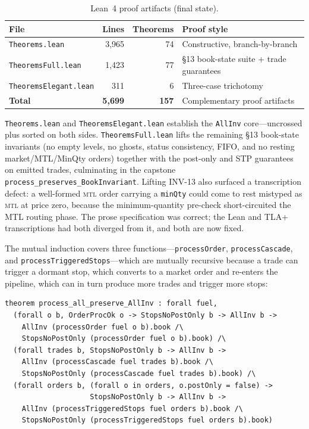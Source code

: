 \documentclass[11pt,a4paper]{article}
\begin{document}
\begin{table}[H]
\centering
\caption{Lean~4 proof artifacts (final state).}
\label{tab:lean-stats}
\small
\begin{tabular}{@{}lrrl@{}}
\toprule
File & Lines & Theorems & Proof style \\
\midrule
\texttt{Theorems.lean}         & 3{,}965 & 74 & Constructive, branch-by-branch \\
\texttt{TheoremsFull.lean}     & 1{,}423 & 77 & \S13 book-state suite + trade guarantees \\
\texttt{TheoremsElegant.lean}  &    311  &  6 & Three-case trichotomy \\
\midrule
\textbf{Total}                 & \textbf{5{,}699} & \textbf{157} & Complementary proof artifacts \\
\bottomrule
\end{tabular}
\end{table}

\texttt{Theorems.lean} and \texttt{TheoremsElegant.lean} establish the
\texttt{AllInv} core---uncrossed plus sorted on both sides.
\texttt{TheoremsFull.lean} lifts the remaining \S13 book-state
invariants (no empty levels, no ghosts, status consistency, FIFO, and
no resting market/MTL/MinQty orders) together with the post-only and
STP guarantees on emitted trades, culminating in the capstone
\texttt{process\_preserves\_BookInvariant}. Lifting INV-13 also
surfaced a transcription defect: a well-formed \textsc{mtl} order
carrying a \texttt{minQty} could come to rest mistyped as \textsc{mtl}
at price zero, because the minimum-quantity pre-check short-circuited
the MTL routing phase. The prose specification was correct; the Lean
and TLA+ transcriptions had both diverged from it, and both are now
fixed.

The mutual induction covers three functions---\texttt{processOrder},
\texttt{processCascade}, and \texttt{processTriggeredStops}---which are
mutually recursive because a trade can trigger a dormant stop, which
converts to a market order and re-enters the pipeline, which can in
turn produce more trades and trigger more stops:

\begin{lstlisting}[language={},basicstyle=\ttfamily\footnotesize]
theorem process_all_preserve_AllInv : forall fuel,
  (forall o b, OrderProcOk o -> StopsNoPostOnly b -> AllInv b ->
    AllInv (processOrder fuel o b).book /\
    StopsNoPostOnly (processOrder fuel o b).book) /\
  (forall trades b, StopsNoPostOnly b -> AllInv b ->
    AllInv (processCascade fuel trades b).book /\
    StopsNoPostOnly (processCascade fuel trades b).book) /\
  (forall orders b, (forall o in orders, o.postOnly = false) ->
                    StopsNoPostOnly b -> AllInv b ->
    AllInv (processTriggeredStops fuel orders b).book /\
    StopsNoPostOnly (processTriggeredStops fuel orders b).book)
\end{lstlisting}
\end{document}
